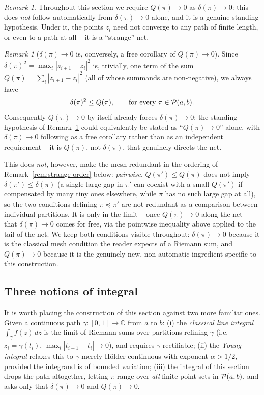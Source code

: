 \documentclass[11pt,fleqn]{article}
\def\C{\mathbb C}
\theoremstyle{plain}
\theoremstyle{remark}
\newtheorem{remark}[thm]{Remark}
\begin{document}
\begin{remark}\label{rem:strange-hyp}
Throughout this section we require $Q(\pi)\to0$ as $\delta(\pi)\to0$: this
does \emph{not} follow automatically from $\delta(\pi)\to0$ alone, and it is
a genuine standing hypothesis. Under it, the points $z_i$ need not converge
to any path of finite length, or even to a path at all -- it is a
``strange'' net.
\end{remark}

\begin{remark}[$\delta(\pi)\to0$ is, conversely, a free corollary of
$Q(\pi)\to0$]\label{rem:delta-from-Q}
Since $\delta(\pi)^2=\max_i|z_{i+1}-z_i|^2$ is, trivially, one term of
the sum $Q(\pi)=\sum_i|z_{i+1}-z_i|^2$ (all of whose summands are
non-negative), we always have
\[
\delta(\pi)^2\le Q(\pi),\qquad\text{for every }\pi\in{\cal P}(a,b).
\]
Consequently $Q(\pi)\to0$ by itself already forces $\delta(\pi)\to0$: the
standing hypothesis of Remark~\ref{rem:strange-hyp} could equivalently be
stated as ``$Q(\pi)\to0$'' alone, with $\delta(\pi)\to0$ following as a
free corollary rather than as an independent requirement -- it is
$Q(\pi)$, not $\delta(\pi)$, that genuinely directs the net.

This does \emph{not}, however, make the mesh redundant in the ordering
of Remark~\ref{rem:strange-order} below: \emph{pairwise},
$Q(\pi')\le Q(\pi)$ does not imply $\delta(\pi')\le\delta(\pi)$ (a single
large gap in $\pi'$ can coexist with a small $Q(\pi')$ if compensated by
many tiny ones elsewhere, while $\pi$ has no such large gap at all), so
the two conditions defining $\pi\preceq\pi'$ are not redundant as a
comparison between individual partitions. It is only in the limit --
once $Q(\pi)\to0$ along the net -- that $\delta(\pi)\to0$ comes for free,
via the pointwise inequality above applied to the tail of the net. We
keep both conditions visible throughout: $\delta(\pi)\to0$ because it is
the classical mesh condition the reader expects of a Riemann sum, and
$Q(\pi)\to0$ because it is the genuinely new, non-automatic ingredient
specific to this construction.
\end{remark}

\subsection*{Three notions of integral}

It is worth placing the construction of this section against two more
familiar ones. Given a continuous path $\gamma\colon[0,1]\to\C$ from $a$ to
$b$: (i) the \emph{classical line integral} $\int_\gamma f(z)\,dz$ is the
limit of Riemann sums over partitions refining $\gamma$ (i.e.\ $z_i=\gamma(t_i)$,
$\max_i|t_{i+1}-t_i|\to0$), and requires $\gamma$ rectifiable; (ii) the
\emph{Young integral} relaxes this to $\gamma$ merely H\"older continuous
with exponent $\alpha>1/2$, provided the integrand is of bounded variation;
(iii) the integral of this section drops the path altogether, letting $\pi$
range over \emph{all} finite point sets in ${\cal P}(a,b)$, and asks only
that $\delta(\pi)\to0$ and $Q(\pi)\to0$.
\end{document}
